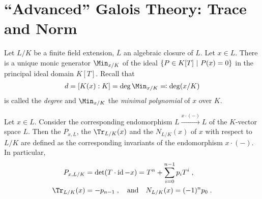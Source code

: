 \documentclass[a4paper,parskip=half,numbers=enddot, DIV=12]{scrreprt}
\begin{document}
\section{``Advanced'' Galois Theory: Trace and Norm}
Let $L/K$ be a finite field extension, $\overline{L}$ an algebraic closure of $L$. Let $x\in L$. There is a unique monic generator $\Min_{x/K}$ of the ideal $\left\{P\in K[T]\ \middle|\  P(x) = 0\right\}$ in the principal ideal domain $K[T]$. Recall that 
\begin{align*}
	d=[K(x):K]=\deg\Min_{x/K}\eqqcolon\deg(x/K)
\end{align*}
is called the \emph{degree} and $\Min_{x/K}$ the \emph{minimal polynomial} of $x$ over $K$.
\begin{defi}
	Let $x\in L$. Consider the corresponding endomorphism $L\xrightarrow{x\cdot(-)} L$ of the $K$-vector space $L$. Then the  $P_{x,L}$, the  $\Tr_{L/K}(x)$ and the  $N_{L/K}(x)$ of $x$ with respect to $L/K$ are defined as the corresponding invariants of the endomorphism $x\cdot(-)$. In particular,
	\begin{align*}
		P_{x,L/K} &= \det(T\cdot \id -x) = T^n+\sum_{i=0}^{n-1} p_iT^i\;,\\
		\Tr_{L/K}(x)&=-p_{n-1}\;,\quad\text{and}\quad N_{L/K}(x)=(-1)^{n}p_0\;.
	\end{align*}
\end{defi}
\end{document}
